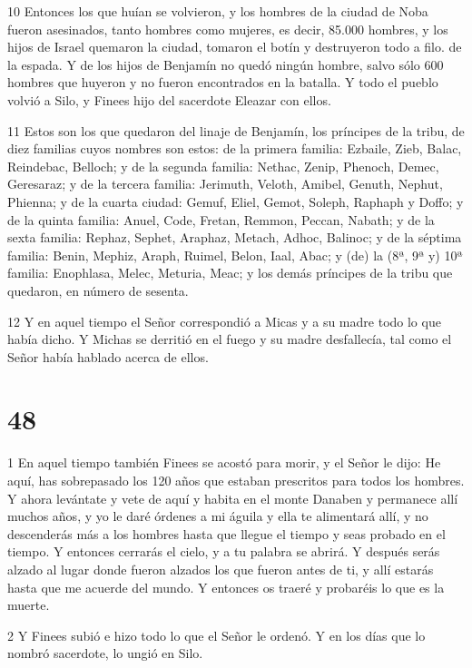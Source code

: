 \par 10 Entonces los que huían se volvieron, y los hombres de la ciudad de Noba fueron asesinados, tanto hombres como mujeres, es decir, 85.000 hombres, y los hijos de Israel quemaron la ciudad, tomaron el botín y destruyeron todo a filo. de la espada. Y de los hijos de Benjamín no quedó ningún hombre, salvo sólo 600 hombres que huyeron y no fueron encontrados en la batalla. Y todo el pueblo volvió a Silo, y Finees hijo del sacerdote Eleazar con ellos.

\par 11 Estos son los que quedaron del linaje de Benjamín, los príncipes de la tribu, de diez familias cuyos nombres son estos: de la primera familia: Ezbaile, Zieb, Balac, Reindebac, Belloch; y de la segunda familia: Nethac, Zenip, Phenoch, Demec, Geresaraz; y de la tercera familia: Jerimuth, Veloth, Amibel, Genuth, Nephut, Phienna; y de la cuarta ciudad: Gemuf, Eliel, Gemot, Soleph, Raphaph y Doffo; y de la quinta familia: Anuel, Code, Fretan, Remmon, Peccan, Nabath; y de la sexta familia: Rephaz, Sephet, Araphaz, Metach, Adhoc, Balinoc; y de la séptima familia: Benin, Mephiz, Araph, Ruimel, Belon, Iaal, Abac; y (de) la (8ª, 9ª y) 10ª familia: Enophlasa, Melec, Meturia, Meac; y los demás príncipes de la tribu que quedaron, en número de sesenta.

\par 12 Y en aquel tiempo el Señor correspondió a Micas y a su madre todo lo que había dicho. Y Michas se derritió en el fuego y su madre desfallecía, tal como el Señor había hablado acerca de ellos.

\chapter{48}

\par 1 En aquel tiempo también Finees se acostó para morir, y el Señor le dijo: He aquí, has sobrepasado los 120 años que estaban prescritos para todos los hombres. Y ahora levántate y vete de aquí y habita en el monte Danaben y permanece allí muchos años, y yo le daré órdenes a mi águila y ella te alimentará allí, y no descenderás más a los hombres hasta que llegue el tiempo y seas probado en el tiempo. Y entonces cerrarás el cielo, y a tu palabra se abrirá. Y después serás alzado al lugar donde fueron alzados los que fueron antes de ti, y allí estarás hasta que me acuerde del mundo. Y entonces os traeré y probaréis lo que es la muerte.

\par 2 Y Finees subió e hizo todo lo que el Señor le ordenó. Y en los días que lo nombró sacerdote, lo ungió en Silo.

